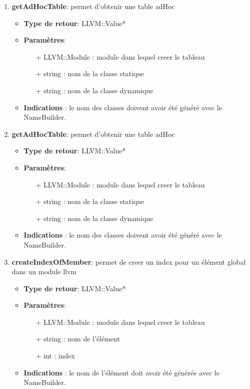 \documentclass{article}
\begin{document}
\begin{enumerate}
  \item \textbf{getAdHocTable}: permet d'obtenir une table adHoc
    \begin{itemize}
    \item \textbf{Type de retour}: LLVM::Value*
    \item \textbf{Paramètres}:
    \begin{enumerate}
      \item[+] LLVM::Module : module dans lequel creer le tableau
      \item[+] string : nom de la classe statique
      \item[+] string : nom de la classe dynamique
    \end{enumerate}
    \item \textbf{Indications} : le nom des classes doivent avoir été généré avec le NameBuilder.
  \end{itemize}

  \item \textbf{getAdHocTable}: permet d'obtenir une table adHoc
    \begin{itemize}
    \item \textbf{Type de retour}: LLVM::Value*
    \item \textbf{Paramètres}:
    \begin{enumerate}
      \item[+] LLVM::Module : module dans lequel creer le tableau
      \item[+] string : nom de la classe statique
      \item[+] string : nom de la classe dynamique
    \end{enumerate}
    \item \textbf{Indications} : le nom des classes doivent avoir été généré avec le NameBuilder.
  \end{itemize}

  \item \textbf{createIndexOfMember}: permet de creer un index pour un élément global dans un module llvm
    \begin{itemize}
    \item \textbf{Type de retour}: LLVM::Value*
    \item \textbf{Paramètres}:
    \begin{enumerate}
      \item[+] LLVM::Module : module dans lequel creer le tableau
      \item[+] string : nom de l'élément
      \item[+] int : index
    \end{enumerate}
    \item \textbf{Indications} : le nom de l'élément doit avoir été générée avec le NameBuilder.
  \end{itemize}


\end{enumerate}
\end{document}

